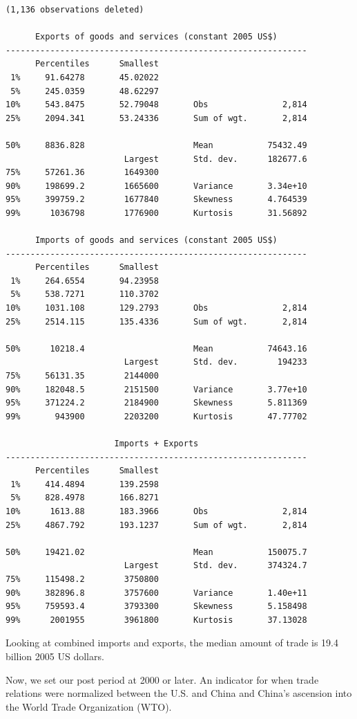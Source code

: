 \documentclass[
]{book}
\begin{document}
\begin{verbatim}
(1,136 observations deleted)

      Exports of goods and services (constant 2005 US$)
-------------------------------------------------------------
      Percentiles      Smallest
 1%     91.64278       45.02022
 5%     245.0359       48.62297
10%     543.8475       52.79048       Obs               2,814
25%     2094.341       53.24336       Sum of wgt.       2,814

50%     8836.828                      Mean           75432.49
                        Largest       Std. dev.      182677.6
75%     57261.36        1649300
90%     198699.2        1665600       Variance       3.34e+10
95%     399759.2        1677840       Skewness       4.764539
99%      1036798        1776900       Kurtosis       31.56892

      Imports of goods and services (constant 2005 US$)
-------------------------------------------------------------
      Percentiles      Smallest
 1%     264.6554       94.23958
 5%     538.7271       110.3702
10%     1031.108       129.2793       Obs               2,814
25%     2514.115       135.4336       Sum of wgt.       2,814

50%      10218.4                      Mean           74643.16
                        Largest       Std. dev.        194233
75%     56131.35        2144000
90%     182048.5        2151500       Variance       3.77e+10
95%     371224.2        2184900       Skewness       5.811369
99%       943900        2203200       Kurtosis       47.77702

                      Imports + Exports
-------------------------------------------------------------
      Percentiles      Smallest
 1%     414.4894       139.2598
 5%     828.4978       166.8271
10%      1613.88       183.3966       Obs               2,814
25%     4867.792       193.1237       Sum of wgt.       2,814

50%     19421.02                      Mean           150075.7
                        Largest       Std. dev.      374324.7
75%     115498.2        3750800
90%     382896.8        3757600       Variance       1.40e+11
95%     759593.4        3793300       Skewness       5.158498
99%      2001955        3961800       Kurtosis       37.13028
\end{verbatim}

Looking at combined imports and exports, the median amount of trade is 19.4 billion 2005 US dollars.

Now, we set our post period at 2000 or later. An indicator for when trade relations were normalized between the U.S. and China and China's ascension into the World Trade Organization (WTO).
\end{document}
